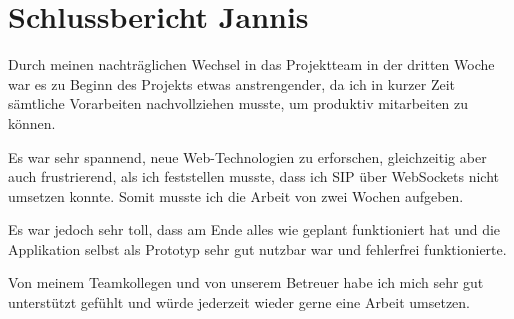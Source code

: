 \chapter{Schlussbericht Jannis}

Durch meinen nachträglichen Wechsel in das Projektteam in der dritten Woche war
es zu Beginn des Projekts etwas anstrengender, da ich in kurzer Zeit sämtliche
Vorarbeiten nachvollziehen musste, um produktiv mitarbeiten zu können.

Es war sehr spannend, neue Web-Technologien zu erforschen, gleichzeitig aber
auch frustrierend, als ich feststellen musste, dass ich SIP über WebSockets
nicht umsetzen konnte. Somit musste ich die Arbeit von zwei Wochen aufgeben.

Es war jedoch sehr toll, dass am Ende alles wie geplant funktioniert hat und die
Applikation selbst als Prototyp sehr gut nutzbar war und fehlerfrei
funktionierte.

Von meinem Teamkollegen und von unserem Betreuer habe ich mich sehr gut
unterstützt gefühlt und würde jederzeit wieder gerne eine Arbeit umsetzen.
